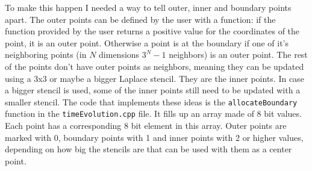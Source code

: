 \documentclass[pdftex,12pt,a4paper]{article}
\begin{document}
		To make this happen I needed a way to tell outer, inner and boundary points apart. The outer points can be defined by the user with a function: if the function provided by the user returns a positive value for the coordinates of the point, it is an outer point. Otherwise a point is at the boundary if one of it's neighboring points (in $N$ dimensions $3^N-1$ neighbors) is an outer point. The rest of the points don't have outer points as neighbors, meaning they can be updated using a 3x3 or maybe a bigger Laplace stencil. They are the inner points. In case a bigger stencil is used, some of the inner points still need to be updated with a smaller stencil. The code that implements these ideas is the \texttt{allocateBoundary} function in the \texttt{timeEvolution.cpp} file. It fills up an array made of 8 bit values. Each point has a corresponding 8 bit element in this array. Outer points are marked with 0, boundary points with 1 and inner points with 2 or higher values, depending on how big the stencils are that can be used with them as a center point.
\end{document}
